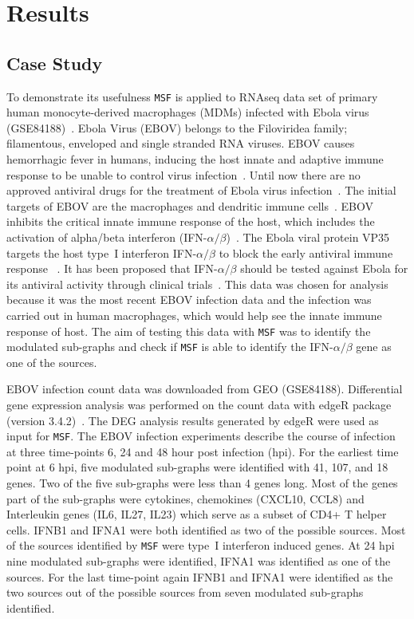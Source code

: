 \documentclass[10pt,a4paper,twocolumn]{article}
\begin{document}
\section*{Results}

\subsection*{Case Study}

To demonstrate its usefulness \texttt{MSF} is applied to RNAseq data
set of primary human monocyte-derived macrophages (MDMs) infected with
Ebola virus (GSE84188)~\cite{Olejnik}. Ebola Virus (EBOV) belongs to
the Filoviridea family; filamentous, enveloped and single stranded RNA
viruses. EBOV causes hemorrhagic fever in humans, inducing the host
innate and adaptive immune response to be unable to control virus
infection~\cite{Prins}. Until now there are no approved antiviral
drugs for the treatment of Ebola virus infection~\cite{Konde,Rhein}.
The initial targets of EBOV are the macrophages and dendritic immune
cells~\cite{Falasca,Rhein}. EBOV inhibits the critical innate immune
response of the host, which includes the activation of alpha/beta
interferon (IFN-$\alpha / \beta$)~\cite{Prins,Konde,Cardenas}. The
Ebola viral protein VP35 targets the host type~I interferon
IFN-$\alpha / \beta$ to block the early antiviral immune response
~\cite{Prins,Konde,Falasca,Cardenas,Olejnik}. It has been proposed
that IFN-$\alpha / \beta$ should be tested against Ebola for its
antiviral activity through clinical trials~\cite{Konde}. This data was chosen for analysis because it was the most recent EBOV infection data and the infection was carried out in human macrophages, which would help see the innate immune response of host. The aim of
testing this data with \texttt{MSF} was to identify the
modulated sub-graphs and check if \texttt{MSF} is able to identify the
IFN-$\alpha / \beta$ gene as one of the sources.

EBOV infection count data was downloaded from GEO
(GSE84188). Differential gene expression analysis was performed on the
count data with edgeR package (version 3.4.2)~\cite{edgeR}. The DEG
analysis results generated by edgeR were used as input for \texttt{MSF}. The
EBOV infection experiments describe the course of infection at three time-points 6, 24 and 48 hour post
infection (hpi). For the earliest time point at 6 hpi, five modulated sub-graphs were
identified with 41, 107, and 18 genes. Two of the five sub-graphs were less than 4 genes long. Most of the genes part of the sub-graphs were cytokines, chemokines
(CXCL10, CCL8) and Interleukin genes (IL6, IL27, IL23) which serve as
a subset of CD4+ T helper cells. IFNB1 and IFNA1 were both identified
as two of the possible sources. Most of the sources identified by
\texttt{MSF} were type~I interferon induced genes. At 24 hpi nine
modulated sub-graphs were identified, IFNA1 was identified as one of
the sources. For the last time-point again IFNB1 and IFNA1 were
identified as the two sources out of the possible sources from seven
modulated sub-graphs identified.
\end{document}
